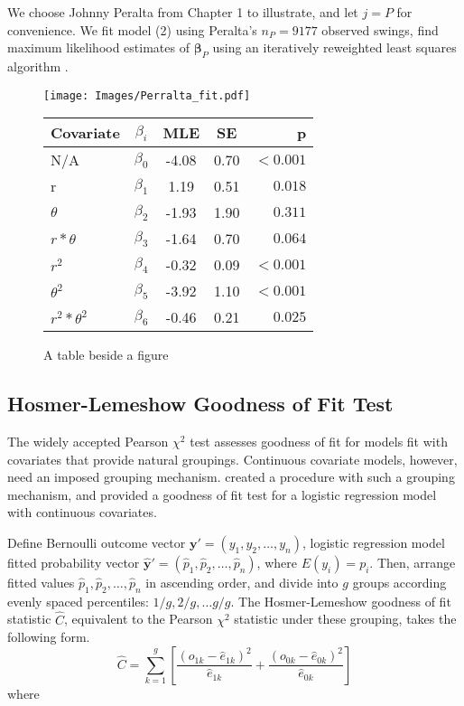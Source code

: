We choose Johnny Peralta from Chapter 1 to illustrate, and let $j = P$ for convenience. We fit model (2) using Peralta's $n_{P} = 9177$ observed swings, find maximum likelihood estimates of $\pmb{\beta}_{P}$ using an iteratively reweighted least squares algorithm \citep{Myers2012}.

  \begin{figure}[!ht]
    \centering
    \texttt{[image: Images/Perralta\_fit.pdf]}
    \qquad
\begin{tabular}[b]{ l | c | c | c | r }
    \hline
    Covariate         & $\beta_{i}$ & MLE   & SE     &      p \\ \hline \hline
    N/A               & $\beta_{0}$ & -4.08 & 0.70 & $ <0.001$ \\ \hline
    r                 & $\beta_{1}$ &  1.19 & 0.51 & $  0.018$ \\ \hline
    $\theta$          & $\beta_{2}$ & -1.93 & 1.90 & $  0.311$ \\ \hline
    $r*\theta$        & $\beta_{3}$ & -1.64 & 0.70 & $  0.064$ \\ \hline
    $r^{2}$           & $\beta_{4}$ & -0.32 & 0.09 & $ <0.001$ \\ \hline
    $\theta^{2}$      & $\beta_{5}$ & -3.92 & 1.10 & $ <0.001$ \\ \hline
    $r^{2}*\theta^{2}$& $\beta_{6}$ & -0.46 & 0.21 & $  0.025$ \\ \hline
    \hline
\end{tabular}
    \captionsetup{labelformat=andtable}
    \caption{A table beside a figure}
  \end{figure}




\subsection{Hosmer-Lemeshow Goodness of Fit Test} %

The widely accepted Pearson $\chi^{2}$ test assesses goodness of fit for models fit with covariates that provide natural groupings. Continuous covariate models, however, need an imposed grouping mechanism. \cite{Hosmer2013} created a procedure with such a grouping mechanism, and provided a goodness of fit test for a logistic regression model with continuous covariates. 

Define Bernoulli outcome vector $\pmb{y}' = (y_{1}, y_{2}, \dots, y_{n})$, logistic regression model fitted probability vector $\hat{\pmb{y}}' = (\hat{p}_{1}, \hat{p}_{2}, \dots, \hat{p}_{n})$, where $E(y_{i}) = p_{i}$. Then, arrange fitted values $\hat{p}_{1}, \hat{p}_{2}, \dots, \hat{p}_{n}$ in ascending order, and divide into $g$ groups according evenly spaced percentiles: $1/g, 2/g, \dots g/g$. The Hosmer-Lemeshow goodness of fit statistic $\hat{C}$, equivalent to the Pearson $\chi^{2}$ statistic under these grouping, takes the following form.
$$ \hat{C} = \sum_{k=1}^{g} \left[ \frac{(o_{1k}-\hat{e}_{1k})^{2}}{\hat{e}_{1k}} + \frac{(o_{0k}-\hat{e}_{0k})^{2}}{\hat{e}_{0k}}      \right] $$
where

